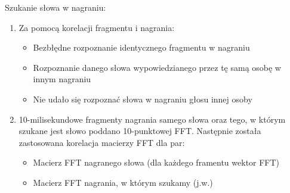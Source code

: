 Szukanie słowa w nagraniu:
\\
\begin{enumerate}
\item 
{
	Za pomocą korelacji fragmentu i nagrania:
	\begin{itemize}
		\item Bezbłędne rozpoznanie identycznego fragmentu w nagraniu
		\item Rozpoznanie danego słowa wypowiedzianego przez tę samą osobę w innym nagraniu
		\item Nie udało się rozpoznać słowa w nagraniu głosu innej osoby
	\end{itemize}
}

\item
{
	10-milisekundowe fragmenty nagrania samego słowa oraz tego, w którym szukane jest słowo poddano 10-punktowej FFT. Następnie została zastosowana korelacja macierzy FFT dla par: 
	\begin{itemize}
		\item Macierz FFT nagranego słowa (dla każdego framentu wektor FFT)
		\item Macierz FFT nagrania, w którym szukamy (j.w.)
	\end{itemize}
}
\end{enumerate}